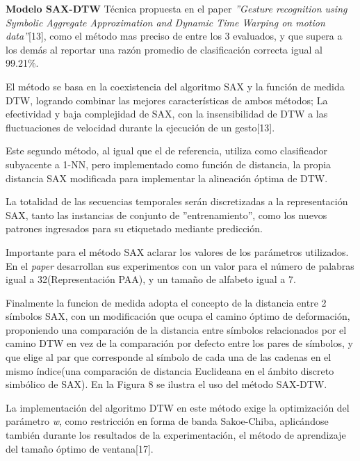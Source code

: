 \hfill\break
\justifying
\textbf{Modelo SAX-DTW}
	\hfill\break
	\justifying
	Técnica propuesta en el paper \textit{''Gesture recognition using Symbolic Aggregate Approximation and Dynamic Time Warping on motion data''}[13], como el método mas preciso de entre los 3 evaluados, y que supera a los demás al reportar una razón promedio de clasificación correcta igual al 99.21\%.
	
	\hfill\break
	\justifying
	El método se basa en la coexistencia del algoritmo SAX y la función de medida DTW, logrando combinar las mejores características de ambos métodos; La efectividad y baja complejidad de SAX, con la insensibilidad de DTW a las fluctuaciones de velocidad durante la ejecución de un gesto[13].
	
	\hfill\break
	\justifying
	Este segundo método, al igual que el de referencia, utiliza como clasificador subyacente a 1-NN, pero implementado como función de distancia, la propia distancia SAX modificada para implementar la alineación óptima de DTW.
	
	\hfill\break
	\justifying
	La totalidad de las secuencias temporales serán discretizadas a la representación SAX, tanto las instancias de conjunto de ''entrenamiento'', como los nuevos patrones ingresados para su etiquetado mediante predicción.
	
	\hfill\break
	\justifying
	Importante para el método SAX aclarar los valores de los parámetros utilizados. En el \textit{paper} desarrollan sus experimentos con un valor para el número de palabras igual a 32(Representación PAA), y un tamaño de alfabeto igual a 7.
	
	\hfill\break
	\justifying
	Finalmente la funcion de medida adopta el concepto de la distancia entre 2 símbolos SAX, con un modificación que ocupa el camino óptimo de deformación, proponiendo una comparación de la distancia entre símbolos relacionados por el camino DTW en vez de la comparación por defecto entre los pares de símbolos, y que elige al par que corresponde al símbolo de cada una de las cadenas en el mismo índice(una comparación de distancia Euclideana en el ámbito discreto simbólico de SAX). En la Figura 8 se ilustra el uso del método SAX-DTW.
	
	\hfill\break
	\justifying
	La implementación del algoritmo DTW en este método exige la optimización del parámetro \textit{w}, como restricción en forma de banda Sakoe-Chiba, aplicándose también durante los resultados de la experimentación, el método de aprendizaje del tamaño óptimo de ventana[17].
	
